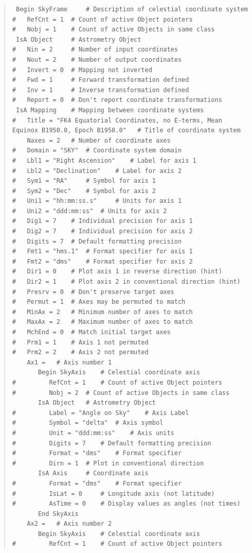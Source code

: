 \documentclass[twoside,11pt]{article}
\begin{document}
\begin{quote}
\small
\begin{verbatim}
 Begin SkyFrame 	# Description of celestial coordinate system
#   RefCnt = 1 	# Count of active Object pointers
#   Nobj = 1 	# Count of active Objects in same class
 IsA Object 	# Astrometry Object
#   Nin = 2 	# Number of input coordinates
#   Nout = 2 	# Number of output coordinates
#   Invert = 0 	# Mapping not inverted
#   Fwd = 1 	# Forward transformation defined
#   Inv = 1 	# Inverse transformation defined
#   Report = 0 	# Don't report coordinate transformations
 IsA Mapping 	# Mapping between coordinate systems
#   Title = "FK4 Equatorial Coordinates, no E-terms, Mean Equinox B1950.0, Epoch B1958.0" 	# Title of coordinate system
    Naxes = 2 	# Number of coordinate axes
#   Domain = "SKY" 	# Coordinate system domain
#   Lbl1 = "Right Ascension" 	# Label for axis 1
#   Lbl2 = "Declination" 	# Label for axis 2
#   Sym1 = "RA" 	# Symbol for axis 1
#   Sym2 = "Dec" 	# Symbol for axis 2
#   Uni1 = "hh:mm:ss.s" 	# Units for axis 1
#   Uni2 = "ddd:mm:ss" 	# Units for axis 2
#   Dig1 = 7 	# Individual precision for axis 1
#   Dig2 = 7 	# Individual precision for axis 2
#   Digits = 7 	# Default formatting precision
#   Fmt1 = "hms.1" 	# Format specifier for axis 1
#   Fmt2 = "dms" 	# Format specifier for axis 2
#   Dir1 = 0 	# Plot axis 1 in reverse direction (hint)
#   Dir2 = 1 	# Plot axis 2 in conventional direction (hint)
#   Presrv = 0 	# Don't preserve target axes
#   Permut = 1 	# Axes may be permuted to match
#   MinAx = 2 	# Minimum number of axes to match
#   MaxAx = 2 	# Maximum number of axes to match
#   MchEnd = 0 	# Match initial target axes
#   Prm1 = 1 	# Axis 1 not permuted
#   Prm2 = 2 	# Axis 2 not permuted
    Ax1 = 	# Axis number 1
       Begin SkyAxis 	# Celestial coordinate axis
#         RefCnt = 1 	# Count of active Object pointers
#         Nobj = 2 	# Count of active Objects in same class
       IsA Object 	# Astrometry Object
#         Label = "Angle on Sky" 	# Axis Label
#         Symbol = "delta" 	# Axis symbol
#         Unit = "ddd:mm:ss" 	# Axis units
#         Digits = 7 	# Default formatting precision
#         Format = "dms" 	# Format specifier
#         Dirn = 1 	# Plot in conventional direction
       IsA Axis 	# Coordinate axis
#         Format = "dms" 	# Format specifier
#         IsLat = 0 	# Longitude axis (not latitude)
#         AsTime = 0 	# Display values as angles (not times)
       End SkyAxis
    Ax2 = 	# Axis number 2
       Begin SkyAxis 	# Celestial coordinate axis
#         RefCnt = 1 	# Count of active Object pointers

\end{verbatim}
\end{quote}
\end{document}
